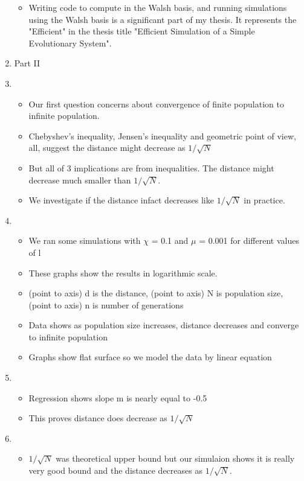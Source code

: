 \documentclass{article}
\begin{document}
\begin{enumerate}
\begin{itemize}
  \item Writing code to compute in the Walsh basis, and running simulations using the Walsh basis 
  is a significant part of my thesis. It represents the "Efficient" in the thesis title "Efficient Simulation of a Simple Evolutionary System".
  \end{itemize}
  
\item {Part II}
  
\item
  \begin{itemize}
  \item Our first question concerns about convergence of finite population to infinite population.
  \item Chebyshev's inequality, Jensen's inequality and geometric point of view, all, suggest the distance might decrease
    as $1/\sqrt{ N}$
  \item But all of 3 implications are from inequalities. The distance
    might decrease much smaller than $1/\sqrt{ N}$.
  \item We investigate if the distance infact decreases like $1/\sqrt{N}$ in practice. 
  \end{itemize}
  
\item
  \begin{itemize}
  \item We ran some simulations with $\chi$ = 0.1 and $\mu$ = 0.001 for
    different values of l
  \item These graphs show the results in logarithmic scale.
  \item  (point to axis) d is the distance, (point to axis) N is population size, (point to axis) n is number of
    generations
  \item Data shows as population size increases, distance decreases and 
    converge to infinite population
  \item Graphs show flat surface so we model the data by linear equation  
  \end{itemize}
    
\item
  \begin{itemize}
  \item Regression shows slope m is nearly equal to -0.5
  \item This proves distance does decrease as $1/\sqrt{N}$  
  \end{itemize}

\item
  \begin{itemize}
  \item $1/\sqrt{N}$ was theoretical upper bound 
  but our simulaion shows it is really very good bound 
  and the distance decreases as $1/\sqrt{N}$. 
  \end{itemize}
    

\end{enumerate}
\end{document}
